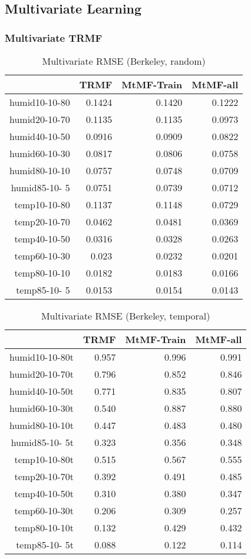 
\subsection{Multivariate Learning}
\subsubsection{Multivariate TRMF}

\begin{table}[htbp]
\caption{Multivariate RMSE (Berkeley, random)}
\label{traffic}
\begin{tabular}{r | r r r}
	&TRMF	&MtMF-Train	&MtMF-all \\ \hline
humid10-10-80	&0.1424	&0.1420	&0.1222\\
humid20-10-70	&0.1135	&0.1135	&0.0973\\
humid40-10-50	&0.0916	&0.0909	&0.0822\\
humid60-10-30	&0.0817	&0.0806	&0.0758\\
humid80-10-10	&0.0757	&0.0748	&0.0709\\
humid85-10- 5	&0.0751	&0.0739	&0.0712\\
 temp10-10-80	&0.1137	&0.1148	&0.0729\\
 temp20-10-70	&0.0462	&0.0481	&0.0369\\
 temp40-10-50	&0.0316	&0.0328	&0.0263\\
 temp60-10-30	&0.023	&0.0232	&0.0201\\
 temp80-10-10	&0.0182	&0.0183	&0.0166\\
 temp85-10- 5	&0.0153	&0.0154	&0.0143\\
\end{tabular}
\end{table}


\begin{table}[htbp]
\caption{Multivariate RMSE (Berkeley, temporal)}
\label{traffic}
\begin{tabular}{r | r r r}
	&TRMF	&MtMF-Train	&MtMF-all \\ \hline
humid10-10-80t	&0.957&0.996& 	0.991\\
humid20-10-70t	&0.796&0.852& 	0.846\\
humid40-10-50t	&0.771&0.835& 	0.807\\
humid60-10-30t	&0.540&0.887& 	0.880\\
humid80-10-10t	&0.447&0.483& 	0.480\\
humid85-10- 5t	&0.323&0.356& 	0.348\\
 temp10-10-80t	&0.515&0.567& 	0.555\\
 temp20-10-70t	&0.392&0.491& 	0.485\\
 temp40-10-50t	&0.310&0.380& 	0.347\\
 temp60-10-30t	&0.206&0.309& 	0.257\\
 temp80-10-10t	&0.132&0.429& 	0.432\\
 temp85-10- 5t	&0.088&0.122& 	0.114\\
\end{tabular}
\end{table}

